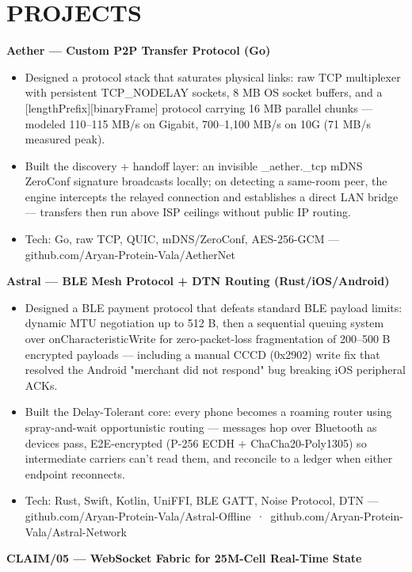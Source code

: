 \documentclass[9pt]{article}
\begin{document}
\section*{PROJECTS}
\textbf{Aether  ---  Custom P2P Transfer Protocol (Go)}
\vspace{1pt}
\begin{itemize}[leftmargin=11pt,itemsep=0pt,topsep=1pt,parsep=0pt]
\item Designed a protocol stack that saturates physical links: raw TCP multiplexer with persistent TCP\_NODELAY sockets, 8 MB OS socket buffers, and a [lengthPrefix][binaryFrame] protocol carrying 16 MB parallel chunks  ---  modeled 110–115 MB/s on Gigabit, 700–1,100 MB/s on 10G (71 MB/s measured peak).
\item Built the discovery + handoff layer: an invisible \_aether.\_tcp mDNS ZeroConf signature broadcasts locally; on detecting a same-room peer, the engine intercepts the relayed connection and establishes a direct LAN bridge  ---  transfers then run above ISP ceilings without public IP routing.
\item Tech: Go, raw TCP, QUIC, mDNS/ZeroConf, AES-256-GCM  ---  github.com/Aryan-Protein-Vala/AetherNet
\end{itemize}
\textbf{Astral  ---  BLE Mesh Protocol + DTN Routing (Rust/iOS/Android)}
\vspace{1pt}
\begin{itemize}[leftmargin=11pt,itemsep=0pt,topsep=1pt,parsep=0pt]
\item Designed a BLE payment protocol that defeats standard BLE payload limits: dynamic MTU negotiation up to 512 B, then a sequential queuing system over onCharacteristicWrite for zero-packet-loss fragmentation of 200–500 B encrypted payloads  ---  including a manual CCCD (0x2902) write fix that resolved the Android "merchant did not respond" bug breaking iOS peripheral ACKs.
\item Built the Delay-Tolerant core: every phone becomes a roaming router using spray-and-wait opportunistic routing  ---  messages hop over Bluetooth as devices pass, E2E-encrypted (P-256 ECDH + ChaCha20-Poly1305) so intermediate carriers can't read them, and reconcile to a ledger when either endpoint reconnects.
\item Tech: Rust, Swift, Kotlin, UniFFI, BLE GATT, Noise Protocol, DTN  ---  github.com/Aryan-Protein-Vala/Astral-Offline \,·\, github.com/Aryan-Protein-Vala/Astral-Network
\end{itemize}
\textbf{CLAIM/05  ---  WebSocket Fabric for 25M-Cell Real-Time State}
\end{document}
